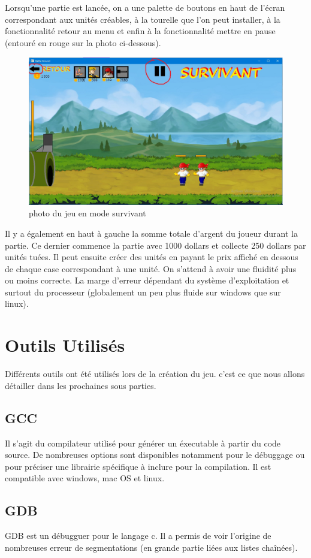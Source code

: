 \documentclass[a4paper,11pt]{article}
\begin{document}
 \smallbreak
Lorsqu'une partie est lancée, on a une palette de boutons en haut de l'écran correspondant aux unités créables, à la tourelle
que l'on peut installer, à la fonctionnalité retour au menu et enfin à la fonctionnalité mettre en pause (entouré en rouge sur la photo ci-dessous).
\begin{figure}[h!]
\centering
\includegraphics [width=1\textwidth]{image3.jpg} 
\caption {\label{image} photo du jeu en mode survivant}
\end{figure}
 \smallbreak
Il y a également en haut à gauche la somme totale d'argent du joueur durant la partie. Ce dernier commence la partie avec 1000
dollars et collecte 250 dollars par unités tuées. Il peut ensuite créer des unités en payant le prix affiché en dessous de chaque case
correspondant à une unité. On s'attend à avoir une fluidité plus ou moins correcte. La marge d'erreur dépendant du système d'exploitation
et surtout du processeur (globalement un peu plus fluide sur windows que sur linux). 

\section {Outils Utilisés}
Différents outils ont été utilisés lors de la création du jeu. c'est ce que nous allons détailler dans les prochaines sous parties.
\subsection{GCC}
Il s'agit du compilateur utilisé pour générer un éxecutable à partir du code source. De nombreuses options sont disponibles notamment pour le débuggage ou pour préciser une librairie spécifique à inclure pour la compilation. Il est compatible avec windows, mac OS et linux.
\subsection{GDB}
GDB est un débugguer pour le langage c. Il a permis de voir l'origine de nombreuses erreur de segmentations (en grande partie liées aux listes chaînées).\\
\end{document}
